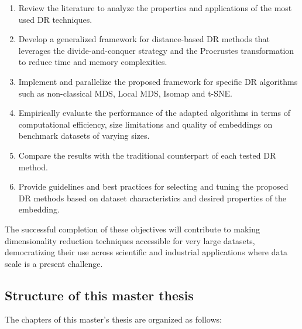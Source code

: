 \begin{enumerate}
    \item Review the literature to analyze the properties and applications of the most used DR techniques.
    \item Develop a generalized framework for distance-based DR methods that leverages the divide-and-conquer strategy and the Procrustes transformation to reduce time and memory complexities.
    \item Implement and parallelize the proposed framework for specific DR algorithms such as non-classical MDS, Local MDS, Isomap and t-SNE.
    \item Empirically evaluate the performance of the adapted algorithms in terms of computational efficiency, size limitations and quality of embeddings on benchmark datasets of varying sizes.
    \item Compare the results with the traditional counterpart of each tested DR method.
    \item Provide guidelines and best practices for selecting and tuning the proposed DR methods based on dataset characteristics and desired properties of the embedding.
\end{enumerate}

The successful completion of these objectives will contribute to making  dimensionality reduction techniques accessible for very large datasets, democratizing their use across scientific and industrial applications where data scale is a present challenge.

\subsection{Structure of this master thesis}

The chapters of this master's thesis are organized as follows:

